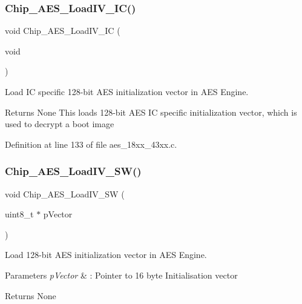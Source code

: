 \subsubsection{\texorpdfstring{Chip\+\_\+\+A\+E\+S\+\_\+\+Load\+I\+V\+\_\+\+I\+C()}{Chip\_AES\_LoadIV\_IC()}}
{\footnotesize\ttfamily void Chip\+\_\+\+A\+E\+S\+\_\+\+Load\+I\+V\+\_\+\+IC (\begin{DoxyParamCaption}\item[{void}]{ }\end{DoxyParamCaption})}



Load IC specific 128-\/bit A\+ES initialization vector in A\+ES Engine. 

\begin{DoxyReturn}{Returns}
None This loads 128-\/bit A\+ES IC specific initialization vector, which is used to decrypt a boot image 
\end{DoxyReturn}


Definition at line 133 of file aes\+\_\+18xx\+\_\+43xx.\+c.

\mbox{\label{group___a_e_s__18_x_x__43_x_x_ga9585571d1a075ed01c739217ca65ffbc}} 
\subsubsection{\texorpdfstring{Chip\+\_\+\+A\+E\+S\+\_\+\+Load\+I\+V\+\_\+\+S\+W()}{Chip\_AES\_LoadIV\_SW()}}
{\footnotesize\ttfamily void Chip\+\_\+\+A\+E\+S\+\_\+\+Load\+I\+V\+\_\+\+SW (\begin{DoxyParamCaption}\item[{uint8\+\_\+t $\ast$}]{p\+Vector }\end{DoxyParamCaption})}



Load 128-\/bit A\+ES initialization vector in A\+ES Engine. 


\begin{DoxyParams}{Parameters}
{\em p\+Vector} & \+: Pointer to 16 byte Initialisation vector \\
\hline
\end{DoxyParams}
\begin{DoxyReturn}{Returns}
None 
\end{DoxyReturn}


